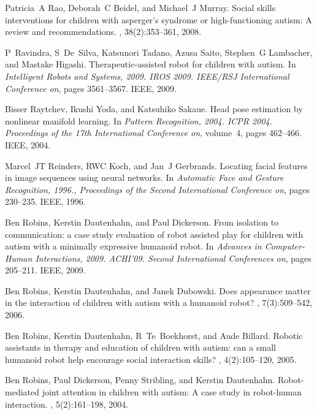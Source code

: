 \documentclass{ut-thesis}
\begin{document}
\begin{thebibliography}{100}
Patricia~A Rao, Deborah~C Beidel, and Michael~J Murray.
\newblock Social skills interventions for children with asperger’s syndrome
  or high-functioning autism: A review and recommendations.
, 38(2):353--361,
  2008.

P~Ravindra, S~De~Silva, Katsunori Tadano, Azusa Saito, Stephen~G Lambacher, and
  Mastake Higashi.
\newblock Therapeutic-assisted robot for children with autism.
\newblock In {\em Intelligent Robots and Systems, 2009. IROS 2009. IEEE/RSJ
  International Conference on}, pages 3561--3567. IEEE, 2009.

Bisser Raytchev, Ikushi Yoda, and Katsuhiko Sakaue.
\newblock Head pose estimation by nonlinear manifold learning.
\newblock In {\em Pattern Recognition, 2004. ICPR 2004. Proceedings of the 17th
  International Conference on}, volume~4, pages 462--466. IEEE, 2004.

Marcel~JT Reinders, RWC Koch, and Jan~J Gerbrands.
\newblock Locating facial features in image sequences using neural networks.
\newblock In {\em Automatic Face and Gesture Recognition, 1996., Proceedings of
  the Second International Conference on}, pages 230--235. IEEE, 1996.

Ben Robins, Kerstin Dautenhahn, and Paul Dickerson.
\newblock From isolation to communication: a case study evaluation of robot
  assisted play for children with autism with a minimally expressive humanoid
  robot.
\newblock In {\em Advances in Computer-Human Interactions, 2009. ACHI'09.
  Second International Conferences on}, pages 205--211. IEEE, 2009.

Ben Robins, Kerstin Dautenhahn, and Janek Dubowski.
\newblock Does appearance matter in the interaction of children with autism
  with a humanoid robot?
, 7(3):509--542, 2006.

Ben Robins, Kerstin Dautenhahn, R~Te~Boekhorst, and Aude Billard.
\newblock Robotic assistants in therapy and education of children with autism:
  can a small humanoid robot help encourage social interaction skills?
, 4(2):105--120,
  2005.

Ben Robins, Paul Dickerson, Penny Stribling, and Kerstin Dautenhahn.
\newblock Robot-mediated joint attention in children with autism: A case study
  in robot-human interaction.
, 5(2):161--198, 2004.


\end{thebibliography}
\end{document}
